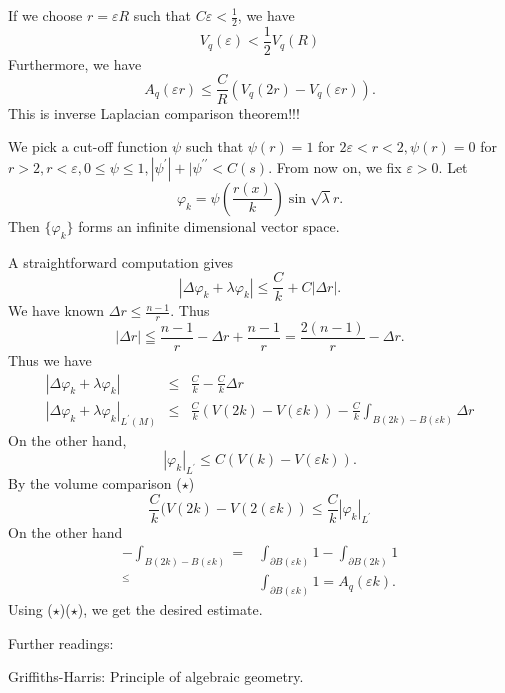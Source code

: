 If we choose $ r = \varepsilon R $ such that $ C \varepsilon < \frac{1}{2}$, we have 
%
\[ V_q (\varepsilon ) < \frac{1}{2} V_q (R) \]
Furthermore, we have 
%
\begin{equation}
A_q (\varepsilon r) \leq \frac{C}{R} (V_q (2r) - V_q (\varepsilon r)). \tag{$\star \star$} \end{equation}
This is inverse Laplacian comparison theorem!!!

We pick a cut-off function $ \psi $ such that $ \psi (r) = 1 $ for $ 2 \varepsilon < r < 2 , \psi (r) = 0 $ for $ r > 2 , r < \varepsilon , 0 \leq \psi \leq 1, |\psi ^\prime |+| \psi ^{\prime \prime } < C(s) $. From now on, we fix $ \varepsilon > 0 $. Let 
%
\[ \varphi _k = \psi \left( \frac{r(x)}{k} \right) \sin \sqrt{\lambda} r.\]
%
Then $ \{ \varphi _k\}$ forms an infinite dimensional vector space. 

A straightforward computation gives 
%
\[ |\Delta \varphi _k + \lambda \varphi_k |\leq \frac{C}{k} + C | \Delta r|.\]
%
We have known $ \Delta r \leq \frac{n-1}{r} $. Thus 
%
\[|\Delta r| \leqq \frac{n-1}{r} - \Delta r + \frac{n-1}{r} = \frac{2(n-1)}{r} - \Delta r .\]
Thus we have 
%
\begin{eqnarray*}  |\Delta \varphi _k + \lambda \varphi _k |&\leq& \frac{C}{k} - \frac{C}{k} \Delta r \\
|\Delta \varphi _k + \lambda \varphi _k |_{L^\prime (M)}&\leq& \frac{C}{k}   (V (2k) - V ( \varepsilon k)) - \frac{C}{k} \int_{B(2k) - B (\varepsilon k) }\Delta r \end{eqnarray*}
%
On the other hand, 
%
\[ | \varphi _k |_{L^{\prime}} \leq C ( V(k) - V ( \varepsilon k)) . \]
%
By the volume comparison ($\star$) 
%
\[ \frac{C}{k}( V(2k) - V (2 (\varepsilon k)) \leq \frac{C}{k}|\varphi _k |_{L^{\prime}}\]
On the other hand 
\begin{eqnarray*}
- \int_{B(2k) - B (\varepsilon k) }  = & \int_{\partial B(\varepsilon k)  } 1 - \int_{\partial B(2k)   } 1 \\
^ \leq & \int_{\partial B(\varepsilon k) } 1 = A_q (\varepsilon k) .
\end{eqnarray*}
Using ($\star$)($\star$), we get the desired estimate.



Further readings:

Griffiths-Harris: Principle of algebraic geometry.




